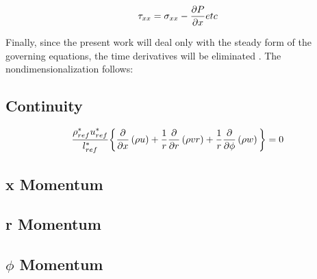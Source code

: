 \begin{equation}
\tau_{xx} = \sigma_{xx} - \pdv{P}{x} etc
\end{equation}

Finally, since the present work will deal only with the steady form of the governing equations, the time derivatives will be eliminated . The nondimensionalization follows:

\subsection{Continuity}

\begin{equation}
\frac{\rho^*_{ref}u^*_{ref}}{l^*_{ref}} \bigg\{
\pdv{x}\left( \rho u \right) 
+ \frac{1}{r}\pdv{r}\left( \rho v r \right)
+ \frac{1}{r}\pdv{\phi}\left(\rho w \right)
\bigg\} = 0
\end{equation}

\subsection{x Momentum}

\subsection{r Momentum}

\subsection{$\phi$ Momentum}
